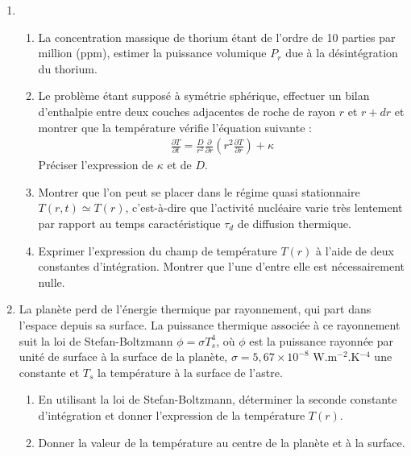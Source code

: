 \begin{enumerate}

\item

\begin{enumerate}

\item La concentration massique de thorium étant de l'ordre de 10 parties par million (ppm), estimer la puissance volumique $P_r$ due à la désintégration du thorium.
	
	\item Le problème étant supposé à symétrie sphérique, effectuer un bilan d'enthalpie entre deux couches adjacentes de roche de rayon $r$ et $r+dr$ et montrer que la température vérifie l'équation suivante :
	\begin{align*}
		\frac{\partial T}{\partial t}=\frac{D}{r^2}\frac{\partial }{\partial r}\left( r^2\frac{\partial T}{\partial r}\right)  + \kappa		
	\end{align*}
Préciser l'expression de $\kappa$ et de $D$.

	\item Montrer que l'on peut se placer dans le régime quasi stationnaire $T(r,t)\simeq T(r)$, c'est-à-dire que l'activité nucléaire varie très lentement par rapport au temps caractéristique $\tau_d$ de diffusion thermique. 
	
	\item Exprimer l'expression du champ de température $T(r)$ à l'aide de deux constantes d'intégration. Montrer que l'une d'entre elle est nécessairement nulle.

\end{enumerate}

\item La planète perd de l'énergie thermique par rayonnement, qui part dans l'espace depuis sa surface. La puissance thermique associée à ce rayonnement suit la loi de Stefan-Boltzmann $\phi=\sigma T_s^4$, où $\phi$ est la puissance rayonnée par unité de surface à la surface de la planète, $\sigma=5,67\times10^{-8}$ W.m$^{-2}$.K$^{-4}$ une constante et $T_s$ la température à la surface de l'astre.

\begin{enumerate}

	 \item En utilisant la loi de Stefan-Boltzmann, déterminer la seconde constante d'intégration et donner l'expression de la température $T(r)$.
	 
	 \item Donner la valeur de la température au centre de la planète et à la surface.

\end{enumerate}

\end{enumerate}

